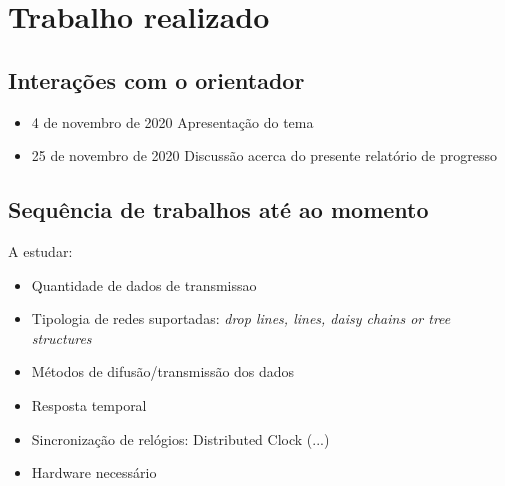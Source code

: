 \section{Trabalho realizado}\label{sec:trabalho}

\subsection{Interações com o orientador}\label{sec:interacoes}
\begin{itemize}
 \item 4 de novembro de 2020
    \subitem Apresentação do tema
 \item 25 de novembro de 2020
    \subitem Discussão acerca do presente relatório de progresso
\end{itemize}



\subsection{Sequência de trabalhos até ao momento}\label{sec:seq_trabalhos}
A estudar:
\begin{itemize}
\item Quantidade de dados de transmissao
\item Tipologia de redes suportadas:
    \subitem \textit{drop lines, lines, daisy chains or tree structures}
\item Métodos de difusão/transmissão dos dados
\item Resposta temporal
\item Sincronização de relógios:
    \subitem Distributed Clock
    \subitem (...)
\item Hardware necessário
\end{itemize}
